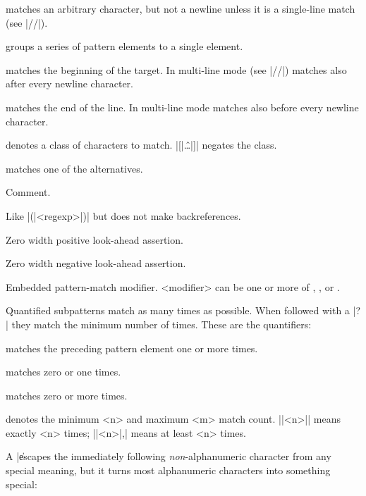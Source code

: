 \begin{enum}{1cm}

matches an arbitrary character, but not a newline unless it is a
single-line match (see |//|).

\Xj{|(|\ldots|)|}
groups a series of pattern elements to a single element.

\Xj{\^}
matches the beginning of the target. In multi-line mode (see
|//|) matches also after every newline character.

\Xj{\$}
matches the end of the line.
In multi-line mode matches also before every newline character.

denotes a class of characters to match. |[|\^\ldots|]| negates the class.

\Xj{|(|\ldots\|\ldots\|\ldots|)|}
matches one of the alternatives.

Comment.\ddag

Like |(|<regexp>|)| but does not make backreferences.\ddag

Zero width positive look-ahead assertion.\ddag

Zero width negative look-ahead assertion.\ddag

Embedded pattern-match modifier. <modifier> can be one or more of
, ,  or .\ddag

\end{enum}

\xtraspace
Quantified subpatterns match as many times as possible. 
When followed with a |?| they match the minimum number of times.
These are the quantifiers:

\begin{enum}{1cm}

\Xj{|+|}
matches the preceding pattern element one or more times.

matches zero or one times.

\Xj{|*|}
matches zero or more times.

denotes the minimum <n> and maximum <m> match count. |{|<n>|}| means
exactly <n> times; |{|<n>|,}| means at least <n> times. 

\end{enum}

\xtraspace
A |\| escapes the immediately following {\it non}-alphanumeric character
from any special meaning, but it turns most alphanumeric characters
into something special:

